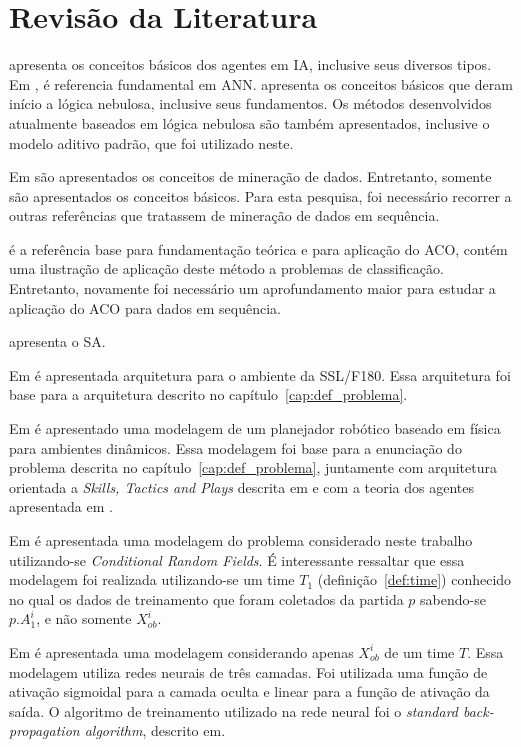 

\chapter{Revisão da Literatura}\label{cap:rev_bibliografica}


\citet{russellnorvig} apresenta os conceitos básicos dos agentes em IA,
inclusive seus diversos tipos. Em \cite{haykin2001redes}, é referencia fundamental
em ANN. \cite{kosko1997fuzzy} apresenta os conceitos básicos que deram início
a lógica nebulosa, inclusive seus fundamentos. Os métodos desenvolvidos
atualmente baseados em lógica nebulosa são também apresentados, inclusive o
modelo aditivo padrão, que foi utilizado neste.

Em \cite{passos2005datamining} são apresentados os conceitos de mineração de
dados. Entretanto, somente são apresentados os conceitos básicos. Para esta
pesquisa, foi necessário recorrer a outras referências que tratassem de
mineração de dados em sequência.

\cite{doringo2004ant} é a referência base para fundamentação teórica e para
aplicação do ACO, contém uma ilustração de aplicação deste método a problemas
de classificação. Entretanto, novamente foi necessário um aprofundamento maior
para estudar a aplicação do ACO para dados em sequência.


\cite{bertsimas1993simulated} apresenta o SA.


Em\cite{felixnavarro} é apresentada arquitetura para o ambiente da SSL/F180.
Essa arquitetura foi base para a arquitetura descrito no
capítulo~\ref{cap:def_problema}.

Em\cite{zickler} é apresentado uma modelagem de um planejador robótico baseado
em física para ambientes dinâmicos. Essa modelagem foi base para a enunciação
do problema descrita no capítulo~\ref{cap:def_problema}, juntamente com
arquitetura orientada a \textit{Skills, Tactics and Plays} descrita em
\cite{bowling2003plays} e com a teoria dos agentes apresentada em
\cite{russellnorvig}.

Em\cite{vail2008crf} é apresentada uma modelagem do problema considerado neste
trabalho utilizando-se \textit{Conditional Random Fields}. É interessante
ressaltar que essa modelagem foi realizada utilizando-se um time $T_1$
(definição~\ref{def:time}) conhecido no qual os dados de treinamento que foram
coletados da partida $p$ sabendo-se $p.A_1^{i}$, e não somente $X_{ob}^{i}$.

Em\cite{sheng2005motionprediction} é apresentada uma modelagem considerando
apenas $X_{ob}^{i}$ de um time $T$. Essa modelagem utiliza redes neurais de
três camadas. Foi utilizada uma função de ativação sigmoidal para a camada
oculta e linear para a função de ativação da saída. O algoritmo de treinamento
utilizado na rede neural foi o \textit{standard back-propagation algorithm},
descrito em\cite{haykin2001redes}.
